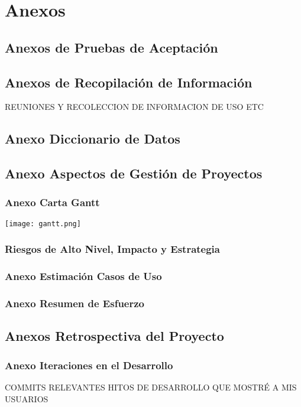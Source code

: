 \chapter{Anexos}

\section{Anexos de Pruebas de Aceptación}

\section{Anexos de Recopilación de Información}
REUNIONES Y RECOLECCION DE INFORMACION DE USO ETC

\section{Anexo Diccionario de Datos}

\section{Anexo Aspectos de Gestión de Proyectos}

\subsection{Anexo Carta Gantt}

\texttt{[image: gantt.png]}

\subsection{Riesgos de Alto Nivel, Impacto y Estrategia}

\subsection{Anexo Estimación Casos de Uso}

\subsection{Anexo Resumen de Esfuerzo}

\section{Anexos Retrospectiva del Proyecto}

\subsection{Anexo Iteraciones en el Desarrollo}

COMMITS RELEVANTES HITOS DE DESARROLLO QUE MOSTRÉ A MIS USUARIOS